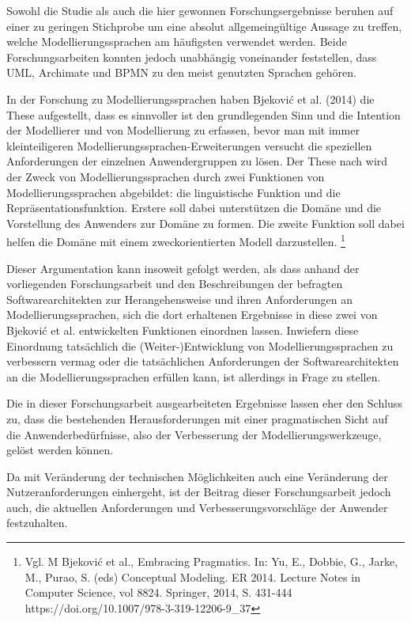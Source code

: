 Sowohl die Studie als auch die hier gewonnen Forschungsergebnisse beruhen auf einer zu geringen Stichprobe um eine absolut allgemeingültige Aussage zu treffen, welche Modellierungssprachen am häufigsten verwendet werden. Beide Forschungsarbeiten konnten jedoch unabhängig voneinander feststellen, dass UML, Archimate und BPMN zu den meist genutzten Sprachen gehören.

In der Forschung zu Modellierungssprachen haben Bjeković et al. (2014) die These aufgestellt, dass es sinnvoller ist den grundlegenden Sinn und die Intention der Modellierer und von Modellierung zu erfassen, bevor man mit immer kleinteiligeren Modellierungssprachen-Erweiterungen versucht die speziellen Anforderungen der einzelnen Anwendergruppen zu lösen. Der These nach wird  der Zweck von Modellierungssprachen durch zwei Funktionen von Modellierungssprachen abgebildet: die linguistische Funktion und die Repräsentationsfunktion. Erstere soll dabei unterstützen die Domäne und die Vorstellung des Anwenders zur Domäne zu formen. Die zweite Funktion soll dabei helfen die Domäne mit einem zweckorientierten Modell darzustellen.
\footnote {Vgl. M Bjeković et al., Embracing Pragmatics. In: Yu, E., Dobbie, G., Jarke, M., Purao, S. (eds) Conceptual Modeling. ER 2014. Lecture Notes in Computer Science, vol 8824.  Springer, 2014, S. 431-444 https://doi.org/10.1007/978-3-319-12206-9_37}

Dieser Argumentation kann insoweit gefolgt werden, als dass anhand der vorliegenden Forschungsarbeit und den Beschreibungen der befragten Softwarearchitekten zur Herangehensweise und ihren Anforderungen an Modellierungssprachen, sich die dort erhaltenen Ergebnisse in diese zwei von Bjeković et al. entwickelten Funktionen einordnen lassen. Inwiefern diese Einordnung tatsächlich die (Weiter-)Entwicklung von Modellierungssprachen zu verbessern vermag oder die tatsächlichen Anforderungen der Softwarearchitekten an die Modellierungssprachen erfüllen kann, ist allerdings in Frage zu stellen.

Die in dieser Forschungsarbeit ausgearbeiteten Ergebnisse lassen eher den Schluss zu, dass die bestehenden Herausforderungen mit einer pragmatischen Sicht auf die Anwenderbedürfnisse, also der Verbesserung der Modellierungswerkzeuge, gelöst werden können. 

Da mit Veränderung der technischen Möglichkeiten auch eine Veränderung der Nutzeranforderungen einhergeht, ist der Beitrag dieser Forschungsarbeit jedoch auch, die aktuellen Anforderungen und Verbesserungsvorschläge der Anwender festzuhalten.

